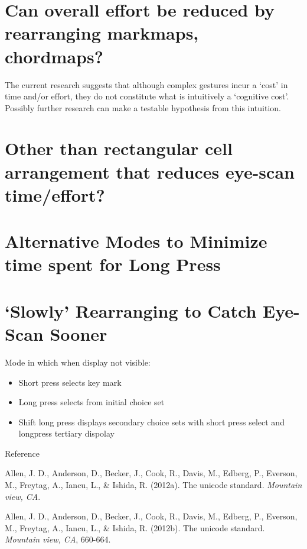 \section{Can overall effort be reduced by rearranging markmaps,
chordmaps?}\label{can-overall-effort-be-reduced-by-rearranging-markmaps-chordmaps}

The current research suggests that although complex gestures incur a
`cost' in time and/or effort, they do not constitute what is intuitively
a `cognitive cost'. Possibly further research can make a testable
hypothesis from this intuition.

\section{Other than rectangular cell arrangement that reduces
eye-scan
time/effort?}\label{other-than-rectangular-cell-arrangement-that-reduces-eye-scan-timeeffort}

\section{Alternative Modes to Minimize time spent for Long
Press}\label{alternative-modes-to-minimize-time-spent-for-long-press}

\section{`Slowly' Rearranging to Catch Eye-Scan
Sooner}\label{slowly-rearranging-to-catch-eye-scan-sooner}

Mode in which when display not visible:

\begin{itemize}
\item
  Short press selects key mark
\item
  Long press selects from initial choice set
\item
  Shift long press displays secondary choice sets with short press
  select and longpress tertiary dispolay
\end{itemize}

Reference

Allen, J. D., Anderson, D., Becker, J., Cook, R., Davis, M., Edberg, P.,
Everson, M., Freytag, A., Iancu, L., \& Ishida, R. (2012a). The unicode
standard. \emph{Mountain view, CA}.

Allen, J. D., Anderson, D., Becker, J., Cook, R., Davis, M., Edberg, P.,
Everson, M., Freytag, A., Iancu, L., \& Ishida, R. (2012b). The unicode
standard. \emph{Mountain view, CA}, 660-664.

